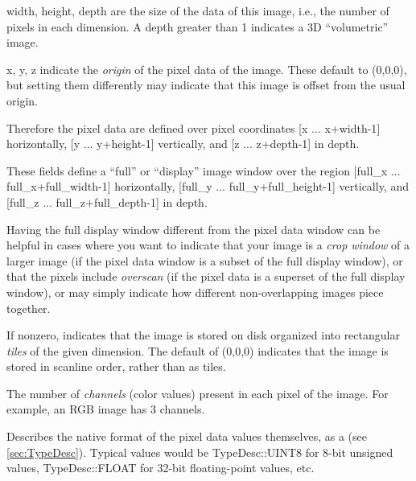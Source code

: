 {\cf width, height, depth} are the size of the data of this image, i.e.,
the number of pixels in each dimension.  A {\cf depth} greater than 1
indicates a 3D ``volumetric'' image.

{\cf x, y, z} indicate the \emph{origin} of the pixel data of the image.
These default to (0,0,0), but setting them differently may indicate that
this image is offset from the usual origin.

Therefore the pixel data are defined over pixel coordinates
[{\cf x} ... {\cf x+width-1}] horizontally, 
[{\cf y} ... {\cf y+height-1}] vertically, 
and [{\cf z} ... {\cf z+depth-1}] in depth.
\apiend


These fields define a ``full'' or ``display'' image window over the
region [{\cf full_x} ... {\cf full_x+full_width-1}] horizontally, 
[{\cf full_y} ... {\cf full_y+full_height-1}] vertically, 
and [{\cf full_z} ... {\cf full_z+full_depth-1}] in depth.

Having the full display window different from the pixel data window can
be helpful in cases where you want to indicate that your image is a
\emph{crop window} of a larger image (if the pixel data window is a
subset of the full display window), or that the pixels include
\emph{overscan} (if the pixel data is a superset of the full display
window), or may simply indicate how different non-overlapping images
piece together.
\apiend

If nonzero, indicates that the image is stored on disk organized into
rectangular \emph{tiles} of the given dimension.  The default of 
(0,0,0) indicates that the image is stored in scanline order, rather
than as tiles.
\apiend

The number of \emph{channels} (color values) present in each pixel of
the image.  For example, an RGB image has 3 channels.
\apiend


Describes the native format of the pixel data values themselves, as a
\TypeDesc (see \ref{sec:TypeDesc}).  Typical values would be 
{\cf TypeDesc::UINT8} for 8-bit unsigned values, {\cf TypeDesc::FLOAT}
for 32-bit floating-point values, etc.

